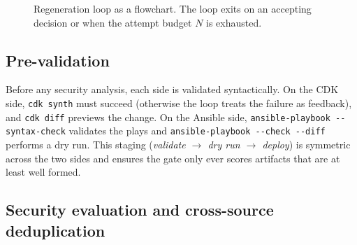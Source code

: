 \begin{figure}[ht]
\centering
{}
\caption{Regeneration loop as a flowchart. The loop exits on an accepting decision or
when the attempt budget $N$ is exhausted.}
\label{fig:method-regen}
\end{figure}

\subsection{Pre-validation}
\label{subsec:method-prevalidation}

Before any security analysis, each side is validated syntactically. On the CDK side,
\texttt{cdk synth} must succeed (otherwise the loop treats the failure as feedback), and
\texttt{cdk diff} previews the change. On the Ansible side,
\texttt{ansible-playbook -{}-syntax-check} validates the plays and
\texttt{ansible-playbook -{}-check -{}-diff} performs a dry run. This staging
(\emph{validate $\rightarrow$ dry run $\rightarrow$ deploy}) is symmetric across the two
sides and ensures the gate only ever scores artifacts that are at least well formed.

\subsection{Security evaluation and cross-source deduplication}
\label{subsec:method-evaluation}

